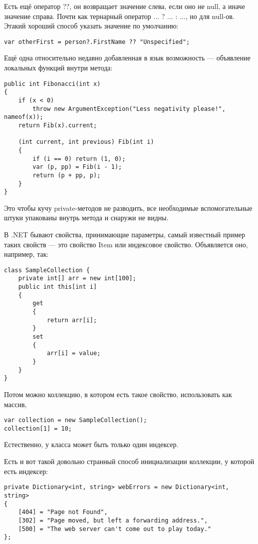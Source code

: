 \documentclass{../../text-style}
\begin{document}
Есть ещё оператор ??, он возвращает значение слева, если оно не null, а иначе значение справа. Почти как тернарный оператор ... ? ... : ..., но для null-ов. Этакий хороший способ указать значение по умолчанию:

\begin{verbatim}
var otherFirst = person?.FirstName ?? "Unspecified";
\end{verbatim}

Ещё одна относительно недавно добавленная в язык возможность --- объявление локальных функций внутри метода:

\begin{verbatim}
public int Fibonacci(int x)
{
    if (x < 0) 
        throw new ArgumentException("Less negativity please!", nameof(x));
    return Fib(x).current;

    (int current, int previous) Fib(int i)
    {
        if (i == 0) return (1, 0);
        var (p, pp) = Fib(i - 1);
        return (p + pp, p);
    }
}
\end{verbatim}

Это чтобы кучу private-методов не разводить, все необходимые вспомогательные штуки упакованы внутрь метода и снаружи не видны.

В .NET бывают свойства, принимающие параметры, самый известный пример таких свойств --- это свойство Item или индексовое свойство. Объявляется оно, например, так: 

\begin{verbatim}
class SampleCollection {
    private int[] arr = new int[100];
    public int this[int i]
    {
        get
        {
            return arr[i];
        }
        set
        {
            arr[i] = value;
        }
    }
}
\end{verbatim}

Потом можно коллекцию, в котором есть такое свойство, использовать как массив,

\begin{verbatim}
var collection = new SampleCollection();
collection[1] = 10;
\end{verbatim}

Естественно, у класса может быть только один индексер.

Есть и вот такой довольно странный способ инициализации коллекции, у которой есть индексер:

\begin{verbatim}
private Dictionary<int, string> webErrors = new Dictionary<int, string>
{
    [404] = "Page not Found",
    [302] = "Page moved, but left a forwarding address.",
    [500] = "The web server can't come out to play today."
};
\end{verbatim}
\end{document}
